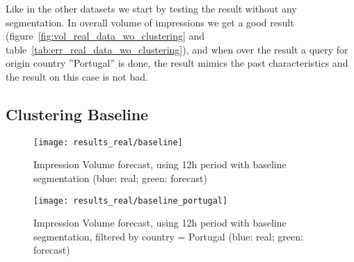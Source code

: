 Like in the other datasets we start by testing the result without any
segmentation. In overall volume of impressions we get a good result
(figure~\ref{fig:vol_real_data_wo_clustering} and
table~\ref{tab:err_real_data_wo_clustering}), and when over the result a query
for origin country ''Portugal'' is done, the result mimics the past
characteristics and the result on this case is not bad.


\subsection*{Clustering Baseline}

\begin{figure}[!ht]
\centering
\begin{minipage}[t]{0.45\linewidth}
\texttt{[image: results\_real/baseline]} \caption[Volume
impression forecast, real data, clustering baseline]{Impression Volume 
forecast, using 12h period with baseline segmentation (blue: real; green: forecast)}
\label{fig:vol_real_data_baseline}
\end{minipage}
\quad
\begin{minipage}[t]{0.45\linewidth}
\texttt{[image: results\_real/baseline\_portugal]} \caption[Volume
impression forecast, real data, clustering baselinei, filtered]{Impression Volume 
forecast, using 12h period with baseline segmentation, filtered by country =
Portugal (blue: real; green: forecast)}
\label{fig:vol_real_data_baseline_filtered}
\end{minipage}

\end{figure}

